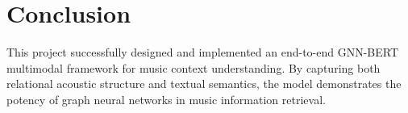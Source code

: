 \documentclass{article}
\begin{document}
\section{Conclusion}
This project successfully designed and implemented an end-to-end GNN-BERT multimodal framework for music context understanding. By capturing both relational acoustic structure and textual semantics, the model demonstrates the potency of graph neural networks in music information retrieval.
\end{document}
